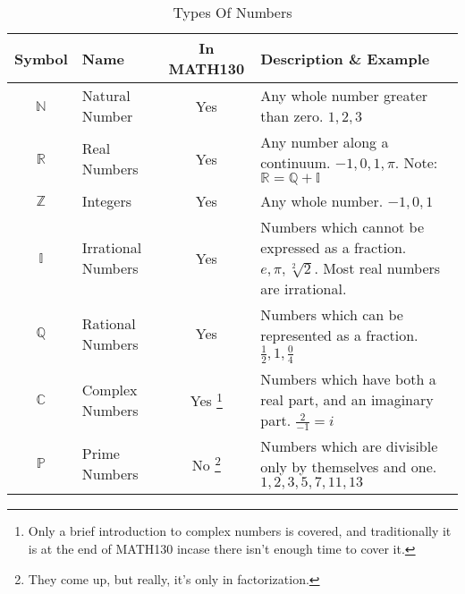 \begin{table}[!htb]
\label{tab:TypesOfNumbers}
\begin{tabularx}{\linewidth}{| c | l | c | X |} \hline
  Symbol & Name & In MATH130 & Description \& Example \\
                                            \hline \hline
  $\mathbb{N}$ & Natural Number     & Yes & Any whole number greater than
                                            zero. $1, 2, 3 $ \\
                                            \hline
  $\mathbb{R}$ & Real Numbers       & Yes & Any number along a continuum.
                                            $-1, 0, 1, \pi $. Note:
                                            $\mathbb{R} = \mathbb{Q} +
                                            \mathbb{I}$
                                           \\
                                            \hline
  $\mathbb{Z}$ & Integers           & Yes & Any whole number.
                                            $-1, 0, 1 $ \\
                                            \hline
  $\mathbb{I}$ & Irrational Numbers & Yes & Numbers which cannot be expressed
                                            as a fraction.
                                            $e, \pi, \sqrt[2]{2}$.
                                            Most real numbers are irrational. \\
                                            \hline
  $\mathbb{Q}$ & Rational Numbers   & Yes & Numbers which can be represented as a
                                            fraction.
                                            $ \frac{1}{2}, 1, \frac{0}{4} $
                                            \\ \hline
  $\mathbb{C}$ & Complex Numbers    & Yes \footnote{Only a brief introduction
  to complex numbers is covered, and traditionally it is at the end of MATH130
  incase there isn't enough time to cover it.}
                                            & Numbers which have both a real
                                            part, and an imaginary part.
                                            $ \frac{2}{-1} = i $ \\ \hline
  $\mathbb{P}$ & Prime Numbers      & No \footnote{They come up, but really, it's
 only in factorization.}
                                            & Numbers which are divisible only
                                            by themselves and one.
                                            $1, 2, 3, 5, 7, 11, 13 $ \\  \hline
\end{tabularx}
\caption{Types Of Numbers}
\end{table}

